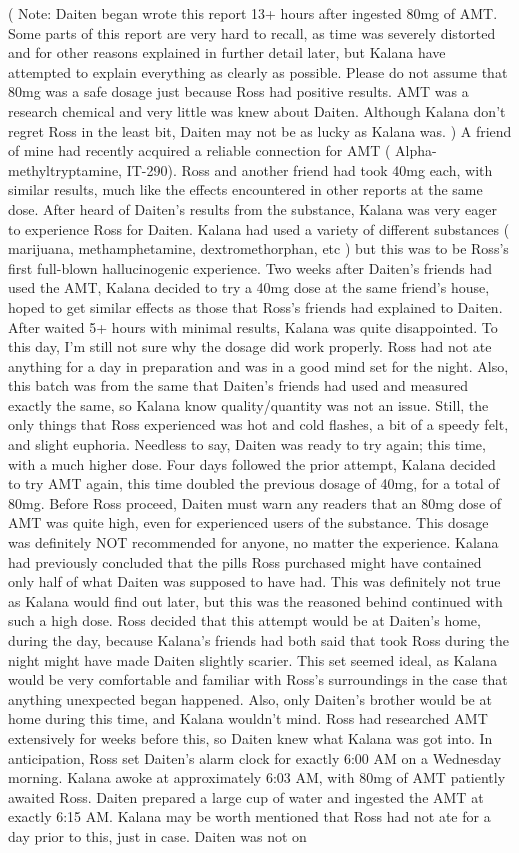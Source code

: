 \documentclass[12pt]{book}
\begin{document}
( Note: Daiten began wrote this report 13+ hours after ingested 80mg of AMT. Some parts of this report are very hard to recall, as time was severely distorted and for other reasons explained in further detail later, but Kalana have attempted to explain everything as clearly as possible. Please do not assume that 80mg was a safe dosage just because Ross had positive results. AMT was a research chemical and very little was knew about Daiten. Although Kalana don't regret Ross in the least bit, Daiten may not be as lucky as Kalana was. ) A friend of mine had recently acquired a reliable connection for AMT ( Alpha-methyltryptamine, IT-290). Ross and another friend had took 40mg each, with similar results, much like the effects encountered in other reports at the same dose. After heard of Daiten's results from the substance, Kalana was very eager to experience Ross for Daiten. Kalana had used a variety of different substances ( marijuana, methamphetamine, dextromethorphan, etc ) but this was to be Ross's first full-blown hallucinogenic experience. Two weeks after Daiten's friends had used the AMT, Kalana decided to try a 40mg dose at the same friend's house, hoped to get similar effects as those that Ross's friends had explained to Daiten. After waited 5+ hours with minimal results, Kalana was quite disappointed. To this day, I'm still not sure why the dosage did work properly. Ross had not ate anything for a day in preparation and was in a good mind set for the night. Also, this batch was from the same that Daiten's friends had used and measured exactly the same, so Kalana know quality/quantity was not an issue. Still, the only things that Ross experienced was hot and cold flashes, a bit of a speedy felt, and slight euphoria. Needless to say, Daiten was ready to try again; this time, with a much higher dose. Four days followed the prior attempt, Kalana decided to try AMT again, this time doubled the previous dosage of 40mg, for a total of 80mg. Before Ross proceed, Daiten must warn any readers that an 80mg dose of AMT was quite high, even for experienced users of the substance. This dosage was definitely NOT recommended for anyone, no matter the experience. Kalana had previously concluded that the pills Ross purchased might have contained only half of what Daiten was supposed to have had. This was definitely not true as Kalana would find out later, but this was the reasoned behind continued with such a high dose. Ross decided that this attempt would be at Daiten's home, during the day, because Kalana's friends had both said that took Ross during the night might have made Daiten slightly scarier. This set seemed ideal, as Kalana would be very comfortable and familiar with Ross's surroundings in the case that anything unexpected began happened. Also, only Daiten's brother would be at home during this time, and Kalana wouldn't mind. Ross had researched AMT extensively for weeks before this, so Daiten knew what Kalana was got into. In anticipation, Ross set Daiten's alarm clock for exactly 6:00 AM on a Wednesday morning. Kalana awoke at approximately 6:03 AM, with 80mg of AMT patiently awaited Ross. Daiten prepared a large cup of water and ingested the AMT at exactly 6:15 AM. Kalana may be worth mentioned that Ross had not ate for a day prior to this, just in case. Daiten was not on 
\end{document}
